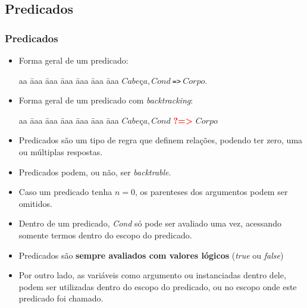 
\subsection{Predicados}
\begin{frame}[c, fragile, allowframebreaks=0.75]
	\frametitle{Predicados}
    
    \begin{itemize}
        \item Forma geral de um predicado:
    
        \begin{tabbing}
          aa \= aaa \= aaa \= aaa \= aaa \= aaa \= aaa \kill
          \> \> $Cabeça, Cond\ $\verb+=>+$\ Corpo$. 
        \end{tabbing}
        
        \item  Forma geral de um predicado com \textit{backtracking}:
        
        \begin{tabbing}
          aa \= aaa \= aaa \= aaa \= aaa \= aaa \= aaa \kill
            \> \> $Cabe$ç$a, Cond$ \textbf{\textcolor{red}{?=>}} $Corpo$
        \end{tabbing}
    \end{itemize}
    
    \framebreak
    
    \begin{itemize}
    	\item Predicados são um tipo de regra que definem relações, podendo ter zero, uma ou múltiplas respostas.
    	
    	\item Predicados podem, ou não, ser \emph{backtrable}.
        
        \item Caso um predicado tenha $n = 0$, os parenteses dos argumentos podem ser omitidos.
        
        \framebreak
        
        \item Dentro de um predicado, \emph{Cond} só pode ser avaliado uma vez, acessando somente termos dentro do escopo do predicado.
        
        \item Predicados são \textbf{sempre avaliados com valores lógicos} ({\em true} ou {\em false})
        
        \item Por outro lado, as variáveis  como argumento ou  instanciadas
        dentro dele, podem ser utilizadas dentro do escopo do predicado, 
        ou no escopo onde
        este predicado foi chamado.
    \end{itemize}
    
\end{frame}

